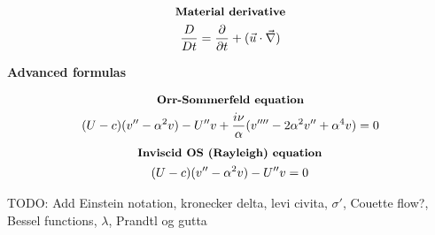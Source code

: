 \documentclass[10pt, a4paper]{article}
\newcommand{\derivative}[2]{\frac{\partial #1}{\partial #2}}
\begin{document}
\begin{multicols*}{2}
    \begin{gather*}
        \textbf{\small Material derivative} \\
        \frac{D}{Dt} = \derivative{}{t} + (\vec{u}\cdot \vec{\nabla})
    \end{gather*}
\end{multicols*}
\begin{center}
    \Large
    \textbf{Advanced formulas}
    \vspace{0.5cm}
\end{center}
\begin{multicols*}{2}
    \begin{gather*}
        \textbf{\small Orr-Sommerfeld equation} \\
        (U - c)(v''-\alpha^2 v) - U''v + \frac{i\nu}{\alpha}(v''''-2\alpha^2v''+\alpha^4v) = 0
    \end{gather*}
    \begin{gather*}
        \textbf{\small Inviscid OS (Rayleigh) equation} \\
        (U - c)(v''-\alpha^2 v) - U''v = 0
    \end{gather*}
\end{multicols*}

TODO: Add Einstein notation, kronecker delta, levi civita, $\sigma '$, Couette flow?, Bessel functions, $\lambda$, Prandtl og gutta
\end{document}
